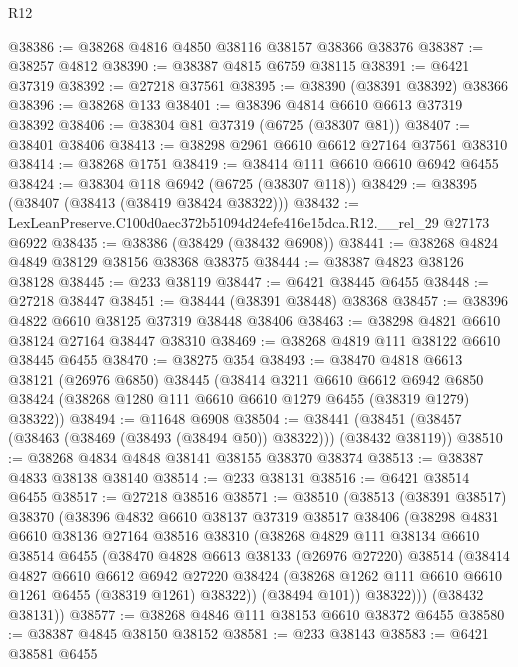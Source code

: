 \begin{lexlean}{R12}
\begin{coremodule}
@38386 := @38268 @4816 @4850 @38116 @38157 @38366 @38376
@38387 := @38257 @4812
@38390 := @38387 @4815 @6759 @38115
@38391 := @6421 @37319
@38392 := @27218 @37561
@38395 := @38390 (@38391 @38392) @38366
@38396 := @38268 @133
@38401 := @38396 @4814 @6610 @6613 @37319 @38392
@38406 := @38304 @81 @37319 (@6725 (@38307 @81))
@38407 := @38401 @38406
@38413 := @38298 @2961 @6610 @6612 @27164 @37561 @38310
@38414 := @38268 @1751
@38419 := @38414 @111 @6610 @6610 @6942 @6455
@38424 := @38304 @118 @6942 (@6725 (@38307 @118))
@38429 := @38395 (@38407 (@38413 (@38419 @38424 @38322)))
@38432 := LexLeanPreserve.C100d0aec372b51094d24efe416e15dca.R12.__rel_29 @27173 @6922
@38435 := @38386 (@38429 (@38432 @6908))
@38441 := @38268 @4824 @4849 @38129 @38156 @38368 @38375
@38444 := @38387 @4823 @38126 @38128
@38445 := @233 @38119
@38447 := @6421 @38445 @6455
@38448 := @27218 @38447
@38451 := @38444 (@38391 @38448) @38368
@38457 := @38396 @4822 @6610 @38125 @37319 @38448 @38406
@38463 := @38298 @4821 @6610 @38124 @27164 @38447 @38310
@38469 := @38268 @4819 @111 @38122 @6610 @38445 @6455
@38470 := @38275 @354
@38493 := @38470
    @4818
    @6613
    @38121
    (@26976 @6850)
    @38445
    (@38414
      @3211
      @6610
      @6612
      @6942
      @6850
      @38424
      (@38268 @1280 @111 @6610 @6610 @1279 @6455 (@38319 @1279) @38322))
@38494 := @11648 @6908
@38504 := @38441 (@38451 (@38457 (@38463 (@38469 (@38493 (@38494 @50)) @38322))) (@38432 @38119))
@38510 := @38268 @4834 @4848 @38141 @38155 @38370 @38374
@38513 := @38387 @4833 @38138 @38140
@38514 := @233 @38131
@38516 := @6421 @38514 @6455
@38517 := @27218 @38516
@38571 := @38510
    (@38513
      (@38391 @38517)
      @38370
      (@38396
        @4832
        @6610
        @38137
        @37319
        @38517
        @38406
        (@38298
          @4831
          @6610
          @38136
          @27164
          @38516
          @38310
          (@38268
            @4829
            @111
            @38134
            @6610
            @38514
            @6455
            (@38470
              @4828
              @6613
              @38133
              (@26976 @27220)
              @38514
              (@38414
                @4827
                @6610
                @6612
                @6942
                @27220
                @38424
                (@38268 @1262 @111 @6610 @6610 @1261 @6455 (@38319 @1261) @38322))
              (@38494 @101))
            @38322)))
      (@38432 @38131))
@38577 := @38268 @4846 @111 @38153 @6610 @38372 @6455
@38580 := @38387 @4845 @38150 @38152
@38581 := @233 @38143
@38583 := @6421 @38581 @6455

\end{coremodule}
\end{lexlean}
